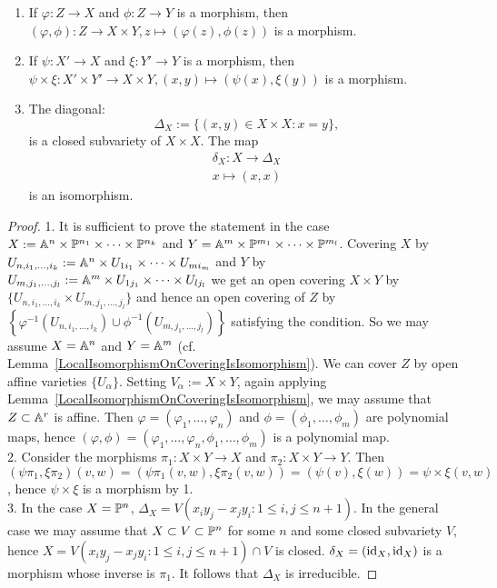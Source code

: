         \begin{proposition}
            \begin{enumerate}
                \item If $\varphi: Z\rightarrow X$ and $\phi: Z\rightarrow Y$ is a morphism, then $(\varphi,\phi): Z\rightarrow X\times Y, z\mapsto (\varphi(z),\phi(z))$ is a morphism. 
                \item If $\psi: X'\rightarrow X$ and $\xi : Y'\rightarrow Y$ is a morphism, then $\psi \times \xi: X'\times Y'\rightarrow X\times Y, (x,y)\mapsto (\psi(x),\xi(y))$ is a morphism.
                \item The diagonal: 
                $$\Delta_X := \{(x,y)\in X\times X : x=y\},$$
                is a closed subvariety of $X\times X$. The map 
                \begin{gather*}
                    \delta_X : X\rightarrow\Delta_X\\
                    x\mapsto (x,x)
                \end{gather*}
                is an isomorphism.
            \end{enumerate}
        \end{proposition}
        \begin{proof}
            1. It is sufficient to prove the statement in the case $X  := \mathbb{A}^n\times \mathbb{P}^{n_1}\times \cdots \times \mathbb{P}^{n_k}$ and $Y =\mathbb{A}^m\times \mathbb{P}^{m_1}\times \cdots \times \mathbb{P}^{m_l}$. Covering $X$ by $U_{n,i_1,\dots,i_k}:=\mathbb{A}^n\times U_{1i_1}\times \cdots \times U_{mi_m}$ and $Y$ by $U_{m,j_1,\dots,j_l}:=\mathbb{A}^m\times U_{1j_1}\times \cdots \times U_{lj_l}$ we get an open covering $X\times Y$ by $\{U_{n,i_1,\dots,i_k}\times U_{m,j_1,\dots,j_l}\}$ and hence an open covering of  $Z$ by $\left\{\varphi^{-1}\left(U_{n,i_1,\dots,i_k}\right)\cup \phi^{-1}\left(U_{m,j_1,\dots,j_l}\right)\right\}$ satisfying the condition. So we may assume $X=\mathbb{A}^n$ and $Y=\mathbb{A}^m$ (cf. Lemma~\ref{LocalIsomorphismOnCoveringIsIsomorphism}). We can cover $Z$ by open affine varieties $\{U_\alpha\}$. Setting $V_\alpha := X\times Y$, again applying Lemma~\ref{LocalIsomorphismOnCoveringIsIsomorphism}, we may assume that $Z\subset \mathbb{A}^r$ is affine. Then $\varphi=(\varphi_1,\dots,\varphi_n)$ and $\phi=(\phi_1,\dots,\phi_m)$ are polynomial maps, hence $(\varphi,\phi) =(\varphi_1,\dots,\varphi_n,\phi_1,\dots,\phi_m)$ is a polynomial map. \\   2. Consider the morphisms $\pi_1 : X\times Y\rightarrow X$ and $\pi_2: X\times Y\rightarrow Y$. Then $(\psi\pi_1,\xi\pi_2)(v,w)=(\psi\pi_1(v,w),\xi\pi_2(v,w))=(\psi(v),\xi(w))=\psi\times\xi(v,w)$, hence $\psi\times \xi$ is a morphism by 1.\\
            3. In the case $X=\mathbb{P}^n$, $\Delta_X= V(x_iy_j-x_jy_i : 1\leq i,j\leq n+1)$. In the general case we may assume that $X\subset V\subset \mathbb{P}^n$ for some $n$ and some closed subvariety $V$, hence $X = V(x_iy_j-x_jy_i : 1\leq i,j\leq n+1) \cap V$ is closed. $\delta_X=(\mathrm{id}_X,\mathrm{id}_X)$ is a morphism whose inverse is $\pi_1$. It follows that $\Delta_X$ is irreducible.
        \end{proof}
